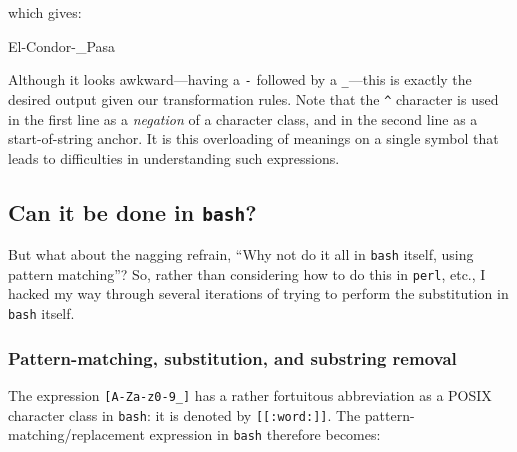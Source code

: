 \documentclass[
  a4paper,
]{article}
\newenvironment{Shaded}{\begin{snugshade}}{\end{snugshade}}
\newcommand{\ExtensionTok}[1]{\textcolor[rgb]{0.80,0.80,0.80}{#1}}
\begin{document}
which gives:

\begin{Shaded}
\begin{Highlighting}[]
\ExtensionTok{El{-}Condor{-}\_Pasa}
\end{Highlighting}
\end{Shaded}

Although it looks awkward---having a \texttt{-} followed by a
\texttt{\_}---this is exactly the desired output given our
transformation rules. Note that the \texttt{\^{}} character is used in
the first line as a \emph{negation} of a character class, and in the
second line as a start-of-string anchor. It is this overloading of
meanings on a single symbol that leads to difficulties in understanding
such expressions.

\hypertarget{can-it-be-done-in-bash}{%
\subsection{\texorpdfstring{Can it be done in
\texttt{bash}?}{Can it be done in bash?}}\label{can-it-be-done-in-bash}}

But what about the nagging refrain, ``Why not do it all in \texttt{bash}
itself, using pattern matching''? So, rather than considering how to do
this in \texttt{perl}, etc., I hacked my way through several iterations
of trying to perform the substitution in \texttt{bash} itself.

\hypertarget{pattern-matching-substitution-and-substring-removal}{%
\subsubsection{Pattern-matching, substitution, and substring
removal}\label{pattern-matching-substitution-and-substring-removal}}

The expression \texttt{{[}A-Za-z0-9\_{]}} has a rather fortuitous
abbreviation as a POSIX character class in \texttt{bash}: it is denoted
by \texttt{{[}{[}:word:{]}{]}}. The pattern-matching/replacement
expression in \texttt{bash} therefore becomes:
\end{document}
